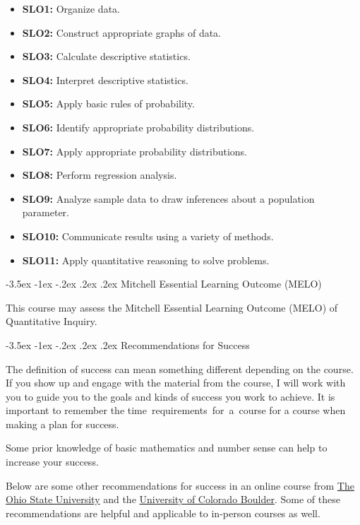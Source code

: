\documentclass[11pt]{article}
\makeatletter
\renewcommand\section{\@startsection{section}{1}{0pt}%
  {-3.5ex \@plus -1ex \@minus -.2ex}%
  {.2ex \@plus.2ex}%
  {\normalfont\Large\bfseries}} %
\makeatother
\begin{document}
\begin{itemize}
\item \textbf{SLO1:} Organize data.
\item \textbf{SLO2:} Construct appropriate graphs of data.
\item \textbf{SLO3:} Calculate descriptive statistics.
\item \textbf{SLO4:} Interpret descriptive statistics.
\item \textbf{SLO5:} Apply basic rules of probability.
\item \textbf{SLO6:} Identify appropriate probability distributions.
\item \textbf{SLO7:} Apply appropriate probability distributions.
\item \textbf{SLO8:} Perform regression analysis.
\item \textbf{SLO9:} Analyze sample data to draw inferences about a population parameter.
\item \textbf{SLO10:} Communicate results using a variety of methods.
\item \textbf{SLO11:} Apply quantitative reasoning to solve problems.
\end{itemize}

\section{Mitchell Essential Learning Outcome (MELO)}

This course may assess the Mitchell Essential Learning Outcome (MELO) of Quantitative Inquiry.

\section{Recommendations for Success}\label{recommendations-for-success}

The definition of success can mean something different depending on the course. If you show up and engage with the material from the course, I will work with you to guide you to the goals and kinds of success you work to achieve. It is important to remember the time~requirements~for~a~course for a course when making a plan for success.

Some prior knowledge of basic mathematics and number sense can help to increase your success.

Below are some other recommendations for success in an online course from \href{https://online.osu.edu/resources/learn/5-online-learning-tips-student-success}{The Ohio State University} and the \href{https://www.colorado.edu/health/tips-succeeding-online-classes}{University of Colorado Boulder}. Some of these recommendations are helpful and applicable to in-person courses as well.
\end{document}
